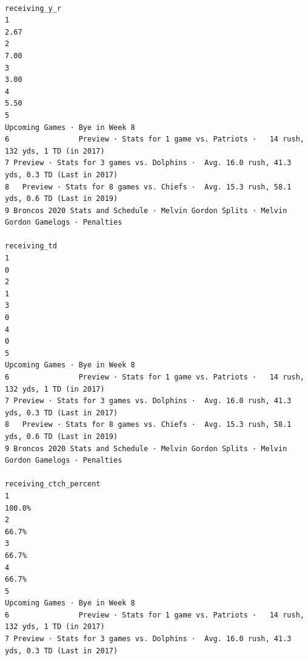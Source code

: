 \documentclass[
]{article}
\begin{document}
\begin{verbatim}
                                                                                receiving_y_r
1                                                                                        2.67
2                                                                                        7.00
3                                                                                        3.00
4                                                                                        5.50
5                                                              Upcoming Games · Bye in Week 8
6                Preview · Stats for 1 game vs. Patriots ·   14 rush, 132 yds, 1 TD (in 2017)
7 Preview · Stats for 3 games vs. Dolphins ·  Avg. 16.0 rush, 41.3 yds, 0.3 TD (Last in 2017)
8   Preview · Stats for 8 games vs. Chiefs ·  Avg. 15.3 rush, 58.1 yds, 0.6 TD (Last in 2019)
9 Broncos 2020 Stats and Schedule · Melvin Gordon Splits · Melvin Gordon Gamelogs · Penalties
                                                                                 receiving_td
1                                                                                           0
2                                                                                           1
3                                                                                           0
4                                                                                           0
5                                                              Upcoming Games · Bye in Week 8
6                Preview · Stats for 1 game vs. Patriots ·   14 rush, 132 yds, 1 TD (in 2017)
7 Preview · Stats for 3 games vs. Dolphins ·  Avg. 16.0 rush, 41.3 yds, 0.3 TD (Last in 2017)
8   Preview · Stats for 8 games vs. Chiefs ·  Avg. 15.3 rush, 58.1 yds, 0.6 TD (Last in 2019)
9 Broncos 2020 Stats and Schedule · Melvin Gordon Splits · Melvin Gordon Gamelogs · Penalties
                                                                       receiving_ctch_percent
1                                                                                      100.0%
2                                                                                       66.7%
3                                                                                       66.7%
4                                                                                       66.7%
5                                                              Upcoming Games · Bye in Week 8
6                Preview · Stats for 1 game vs. Patriots ·   14 rush, 132 yds, 1 TD (in 2017)
7 Preview · Stats for 3 games vs. Dolphins ·  Avg. 16.0 rush, 41.3 yds, 0.3 TD (Last in 2017)

\end{verbatim}
\end{document}
